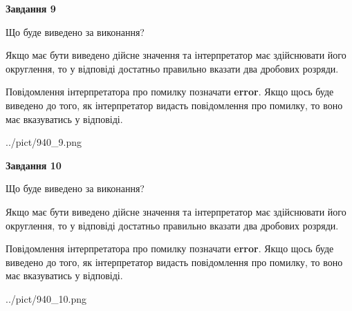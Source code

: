 \documentclass[12pt, ukrainian]{article}
\begin{document}
{\begin {Large}
{\begin {center}\textbf{Завдання 9}\end {center}}\par
Що буде виведено за виконання? \par

Якщо має бути виведено дійсне значення та інтерпретатор має здійснювати його округлення, 
то у відповіді достатньо правильно вказати два дробових розряди.

Повідомлення інтерпретатора про помилку позначати \textbf{error}.
Якщо щось буде виведено до того, як інтерпретатор видасть повідомлення про помилку, 
то воно має вказуватись у відповіді. \par

\begin{center}
	{../pict/940_9.png}
\end{center}
\newpage

{\begin {center}\textbf{Завдання 10}\end {center}}\par
Що буде виведено за виконання? \par

Якщо має бути виведено дійсне значення та інтерпретатор має здійснювати його округлення, 
то у відповіді достатньо правильно вказати два дробових розряди.

Повідомлення інтерпретатора про помилку позначати \textbf{error}.
Якщо щось буде виведено до того, як інтерпретатор видасть повідомлення про помилку, 
то воно має вказуватись у відповіді. \par

\begin{center}
	{../pict/940_10.png}
\end{center}
\newpage

\end {Large}}
\end{document}
